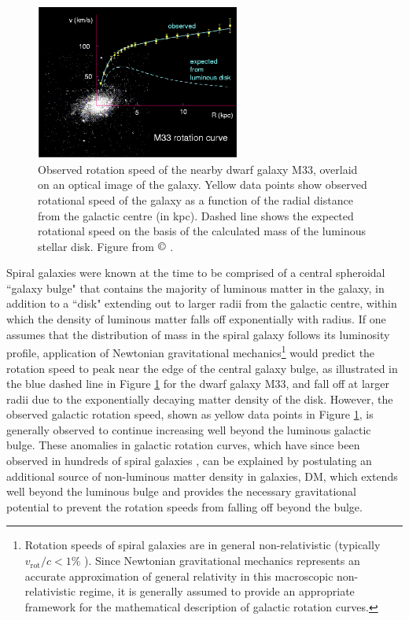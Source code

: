 \begin{figure}[H]
	\centering
	\includegraphics[width=0.6\textwidth]{Figures/1/m33_rotation.pdf}
	\caption[]{Observed rotation speed of the nearby dwarf galaxy M33, overlaid on an optical image of the galaxy. Yellow data points show observed rotational speed of the galaxy as a function of the radial distance from the galactic centre (in kpc). Dashed line shows the expected rotational speed on the basis of the calculated mass of the luminous stellar disk. Figure from \(\copyright\) \cite{m33_2000}.}
	\label{fig:m33_rotation}
\end{figure}

Spiral galaxies were known at the time to be comprised of a central spheroidal ``galaxy bulge" that contains the majority of luminous matter in the galaxy, in addition to a ``disk" extending out to larger radii from the galactic centre, within which the density of luminous matter falls off exponentially with radius. If one assumes that the distribution of mass in the spiral galaxy follows its luminosity profile, application of Newtonian gravitational mechanics\footnote{Rotation speeds of spiral galaxies are in general non-relativistic (typically \(v_\text{rot}/c<1\%\) \cite{rotn_curves_1995}). Since Newtonian gravitational mechanics represents an accurate approximation of general relativity in this macroscopic non-relativistic regime, it is generally assumed to provide an appropriate framework for the mathematical description of galactic rotation curves.} would predict the rotation speed to peak near the edge of the central galaxy bulge, as illustrated in the blue dashed line in Figure \ref{fig:m33_rotation} for the dwarf galaxy M33, and fall off at larger radii due to the exponentially decaying matter density of the disk. However, the observed galactic rotation speed, shown as yellow data points in Figure \ref{fig:m33_rotation}, is generally observed to continue increasing well beyond the luminous galactic bulge. These anomalies in galactic rotation curves, which have since been observed in hundreds of spiral galaxies \cite{rotn_curves_1995}, can be explained by postulating an additional source of non-luminous matter density in galaxies, DM, which extends well beyond the luminous bulge and provides the necessary gravitational potential to prevent the rotation speeds from falling off beyond the bulge.

